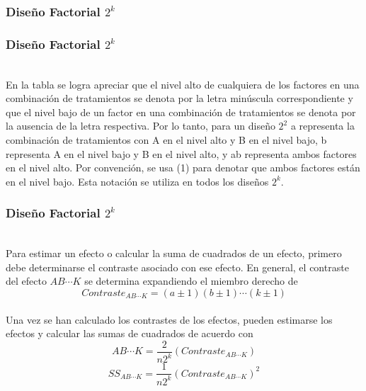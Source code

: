 \documentclass[12pt]{beamer}
\begin{document}
\begin{frame}
\frametitle{Diseño Factorial $ 2^{k} $}
\begin{table}[H]
  \centering
  \caption{Matriz de Diseño}
  \label{tab:addlabel}%
\end{table}%
\end{frame}

\begin{frame}
\frametitle{Diseño Factorial $ 2^{k} $}
~\\En la tabla se logra apreciar que el nivel alto de cualquiera de los factores en una combinación de tratamientos se denota por la letra minúscula correspondiente y que el nivel bajo de un factor en una combinación de tratamientos se denota por la ausencia de la letra respectiva. Por lo tanto, para un diseño $2^2$ a representa la combinación de tratamientos con A en el nivel alto y B en el nivel bajo, b representa A en el nivel bajo y B en el nivel alto, y ab representa ambos factores en el nivel alto. Por convención, se usa (1) para denotar que ambos factores están en el nivel bajo. Esta notación se utiliza en todos los diseños $2^k$.
\end{frame}

\begin{frame}
\frametitle{Diseño Factorial $ 2^{k} $}
~\\Para estimar un efecto o calcular la suma de cuadrados de un efecto, primero debe determinarse el contraste asociado con ese efecto. En general, el contraste del efecto $AB\cdots K$ se determina expandiendo el miembro derecho de
$$Contraste_{AB\cdots K}=(a\pm 1)(b\pm 1)\cdots(k\pm 1)$$
~\\Una vez se han calculado los contrastes de los efectos, pueden estimarse los efectos y calcular las sumas de cuadrados de acuerdo con
$$AB\cdots K=\frac{2}{n2^k}(Contraste_{AB\cdots K})$$
$$SS_{AB\cdots K}=\frac{1}{n2^k}(Contraste_{AB\cdots K})^2$$

\end{frame}
\end{document}
